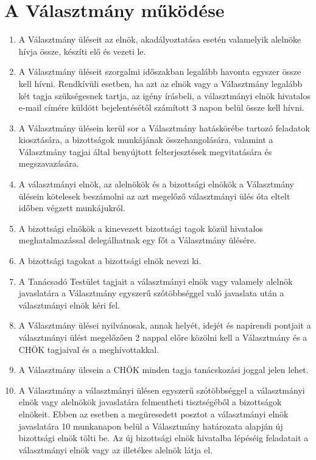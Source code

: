 \documentclass{../styles/rulebook}
\begin{document}
\section{A Választmány működése}

\begin{enumerate}
	\item A Választmány üléseit az elnök, akadályoztatása esetén valamelyik alelnöke hívja össze, készíti elő és vezeti le.
	\item A Választmány üléseit szorgalmi időszakban legalább havonta egyszer össze kell hívni. Rendkívüli esetben, ha azt az elnök vagy a Választmány legalább két tagja szükségesnek tartja, az igény írásbeli, a választmányi elnök hivatalos e-mail címére küldött bejelentésétől számított 3 napon belül össze kell hívni.
	\item A Választmány ülésein kerül sor a Választmány hatáskörébe tartozó feladatok kiosztására, a bizottságok munkájának összehangolására, valamint a Választmány tagjai által benyújtott felterjesztések megvitatására és megszavazására.
	\item A választmányi elnök, az alelnökök és a bizottsági elnökök a Választmány ülésein kötelesek beszámolni az azt megelőző választmányi ülés óta eltelt időben végzett munkájukról.
	\item A bizottsági elnökök a kinevezett bizottsági tagok közül hivatalos meghatalmazással delegálhatnak egy főt a Választmány ülésére.
	\item A bizottsági tagokat a bizottsági elnök nevezi ki.
	\item A Tanácsadó Testület tagjait a választmányi elnök vagy valamely alelnök javaslatára a Választmány egyszerű szótöbbséggel való javaslata után a választmányi elnök kéri fel.
	\item A Választmány ülései nyilvánosak, annak helyét, idejét és napirendi pontjait a választmányi ülést megelőzően 2 nappal előre közölni kell a Választmány és a CHÖK tagjaival és a meghívottakkal.
	\item A Választmány ülesein a CHÖK minden tagja tanácskozási joggal jelen lehet.
	\item A Választmány a választmányi ülésen egyszerű szótöbbséggel a választmányi elnök vagy alelnökök javaslatára felmentheti tisztségéből a bizottságok elnökeit. Ebben az esetben a megüresedett posztot a választmányi elnök javaslatára 10 munkanapon belül a Választmány határozata alapján új bizottsági elnök tölti be. Az új bizottsági elnök hivatalba lépéséig feladatait a választmányi elnök vagy az illetékes alelnök látja el.

\end{enumerate}
\end{document}
